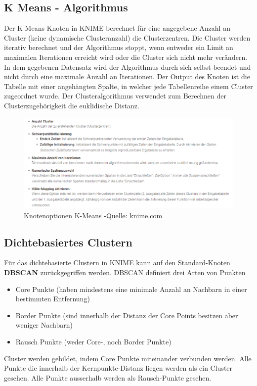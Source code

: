 \documentclass[12pt,					%
							 oneside,			%
							 a4paper,			%
							 halfparskip,		%
							 liststotoc,			%
							 bibtotoc,			%
							 fleqn,				%
							 pointlessnumbers]	%
							 {scrreprt}
\begin{document}
		\subsection{K Means - Algorithmus}
		Der K Means Knoten in KNIME berechnet für eine angegebene Anzahl an Cluster (keine dynamische Clusteranzahl) die Clusterzentren. Die Cluster werden iterativ berechnet und der Algorithmus stoppt, wenn entweder ein Limit an maximalen Iterationen erreicht wird oder die Cluster sich nicht mehr verändern. In dem gegebenen Datensatz wird der Algorithmus durch sich selbst beendet und nicht durch eine maximale Anzahl an Iterationen. Der Output des Knoten ist die Tabelle mit einer angehängten Spalte, in welcher jede Tabellenreihe einem Cluster zugeordnet wurde. Der Clusteralgorithmus verwendet zum Berechnen der Clusterzugehörigkeit die euklidische Distanz.
		\begin{figure}[h]
			\begin{center}
				\includegraphics[scale=0.7]{pictures/kmeans-knoten.png}
				\caption{Knotenoptionen K-Means -Quelle: knime.com}									

			\end{center}
		\end{figure}
		
		\subsection{Dichtebasiertes Clustern}
		Für das dichtebasierte Clustern in KNIME kann auf den Standard-Knoten \textbf{DBSCAN} zurückgegriffen werden.
		DBSCAN definiert drei Arten von Punkten
		\begin{itemize}
		\item Core Punkte (haben mindestens eine minimale Anzahl an Nachbarn in einer bestimmten Entfernung)
		\item Border Punkte (sind innerhalb der Distanz der Core Points besitzen aber weniger Nachbarn)
		\item Rausch Punkte (weder Core-, noch Border Punkte)
		\end{itemize}
		\newpage
		Cluster werden gebildet, indem Core Punkte miteinander verbunden werden. Alle Punkte die innerhalb der Kernpunkte-Distanz liegen werden als ein Cluster gesehen. Alle Punkte ausserhalb werden als Rausch-Punkte gesehen.
		
\end{document}
